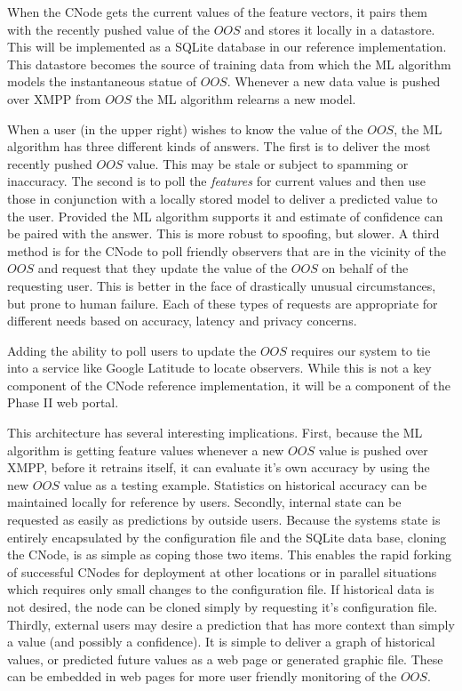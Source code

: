 When the CNode gets the current values of the feature vectors, it pairs them
with the recently pushed value of the $OOS$ and stores it locally in a
datastore.  This will be implemented as a SQLite database in our reference
implementation.  This datastore becomes the source of training data from which
the ML algorithm models the instantaneous statue of $OOS$. Whenever a new data
value is pushed over XMPP from $OOS$ the ML algorithm relearns a new model.

When a user (in the upper right) wishes to know the value of the $OOS$, the ML
algorithm has three different kinds of answers.  The first is to deliver the
most recently pushed $OOS$ value.  This may be stale or subject to spamming or
inaccuracy.  The second is to poll the \emph{features} for current values and then use
those in conjunction with a locally stored model to deliver a predicted value to
the user.  Provided the ML algorithm supports it and estimate of confidence can
be paired with the answer.  This is more robust to spoofing, but slower. A third method is for the CNode to poll friendly
observers that are in the vicinity of the $OOS$ and request that they update the
value of the $OOS$ on behalf of the requesting user. This is better in the face
of drastically unusual circumstances, but prone to human failure. Each of these types of
requests are appropriate for different needs based on accuracy, latency and privacy concerns.

Adding the ability to poll users to update the $OOS$ requires our system to tie
into a service like Google Latitude to locate observers.  While this is not a
key component of the CNode reference implementation, it will be a component of
the Phase II web portal. 

This architecture has several interesting implications. First, because the ML
algorithm is getting feature values whenever a new $OOS$ value is pushed over
XMPP, before it retrains itself, it can evaluate it's own accuracy by using the
new $OOS$ value as a testing example.  Statistics on historical accuracy can be
maintained locally for reference by users.  Secondly, internal state can be
requested as easily as predictions by outside users.  Because the systems state
is entirely encapsulated by the configuration file and the SQLite data base,
cloning the CNode, is as simple as coping those two items.   This enables the
rapid forking of successful CNodes for deployment at other locations or in
parallel situations which requires only small changes to the configuration file.
If historical data is not desired, the node can be cloned simply by requesting
it's configuration file.  Thirdly, external users may desire a prediction that
has more context than simply a value (and possibly a confidence).  It is simple
to deliver a graph of historical values, or predicted future values as a web
page or generated graphic file.  These can be embedded in web pages for more
user friendly monitoring of the $OOS$.

